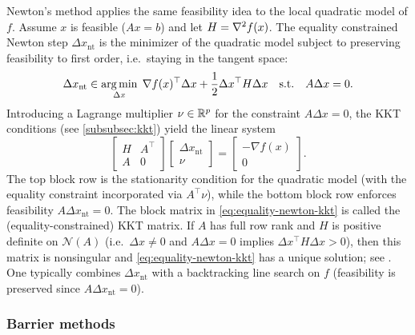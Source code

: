 Newton's method applies the same feasibility idea to the local quadratic model of $f$.
Assume $x$ is feasible ($Ax=b$) and let $H=\nabla^2 f(x)$.
The equality constrained Newton step $\Delta x_{\mathrm{nt}}$ is the minimizer of the quadratic model subject to preserving feasibility to first order, i.e.\ staying in the tangent space:
\[
  \Delta x_{\mathrm{nt}}
  \in \operatorname*{arg\,min}_{\Delta x}\; \nabla f(x)^\top \Delta x + \frac12 \Delta x^\top H \Delta x
  \quad\text{s.t.}\quad
  A\Delta x = 0.
\]
Introducing a Lagrange multiplier $\nu\in\mathbb{R}^p$ for the constraint $A\Delta x=0$, the KKT conditions (see \cref{subsubsec:kkt}) yield the linear system
\begin{equation}
  \begin{bmatrix}
    H & A^\top \\
    A & 0
  \end{bmatrix}
  \begin{bmatrix}
    \Delta x_{\mathrm{nt}} \\
    \nu
  \end{bmatrix}
  =
  \begin{bmatrix}
    -\nabla f(x) \\
    0
  \end{bmatrix}.
  \label{eq:equality-newton-kkt}
\end{equation}
The top block row is the stationarity condition for the quadratic model (with the equality constraint incorporated via $A^\top\nu$), while the bottom block row enforces feasibility $A\Delta x_{\mathrm{nt}}=0$.
The block matrix in \eqref{eq:equality-newton-kkt} is called the (equality-constrained) KKT matrix.
If $A$ has full row rank and $H$ is positive definite on $\mathcal{N}(A)$ (i.e.\ $\Delta x\ne 0$ and $A\Delta x=0$ implies $\Delta x^\top H \Delta x>0$), then this matrix is nonsingular and \eqref{eq:equality-newton-kkt} has a unique solution; see \citet[\S10.2]{boyd_vandenberghe_2004_convex}.
One typically combines $\Delta x_{\mathrm{nt}}$ with a backtracking line search on $f$ (feasibility is preserved since $A\Delta x_{\mathrm{nt}}=0$).

\subsubsection{Barrier methods}
\label{subsubsec:log-barrier}

